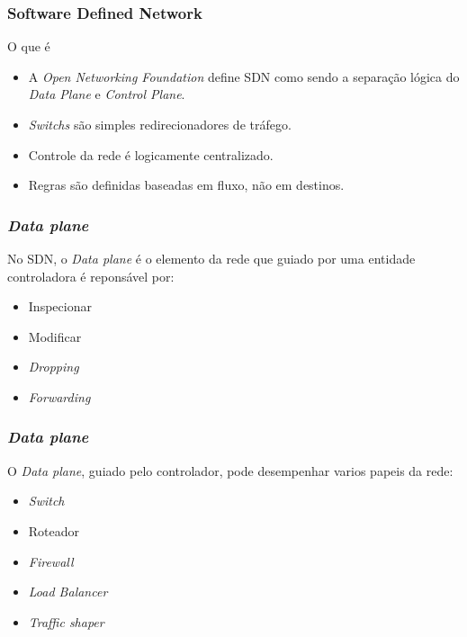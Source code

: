 \documentclass{beamer}
\begin{document}
\begin{frame}
    \frametitle{Software Defined Network}

    O que é

    \begin{itemize}
        \item A \textit{Open Networking Foundation} define SDN como sendo a separação lógica do \textit{Data Plane} e \textit{Control Plane}.
        \item \textit{Switchs} são simples redirecionadores de tráfego.
        \item Controle da rede é logicamente centralizado.
        \item Regras são definidas baseadas em fluxo, não em destinos.
    \end{itemize}
\end{frame}

\begin{frame}
    \frametitle{\textit{Data plane}}

    No SDN, o \textit{Data plane} é o elemento da rede que guiado por uma entidade controladora é reponsável por:

    \begin{itemize}
        \item Inspecionar
        \item Modificar
        \item \textit{Dropping}
        \item \textit{Forwarding}
    \end{itemize}

\end{frame}

\begin{frame}
    \frametitle{\textit{Data plane}}

    O \textit{Data plane}, guiado pelo controlador, pode desempenhar varios papeis da rede:

    \begin{itemize}
        \item \textit{Switch}
        \item Roteador
        \item \textit{Firewall}
        \item \textit{Load Balancer}
        \item \textit{Traffic shaper}
    \end{itemize}

\end{frame}
\end{document}
